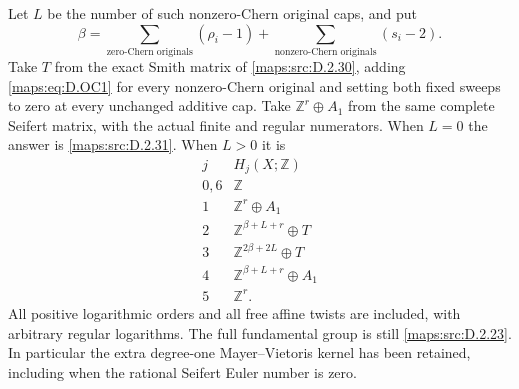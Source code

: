 \begin{theorem}
Let $L$ be the number of such nonzero-Chern original caps,
and put
\[
 \beta=
 \sum_{\text{zero-Chern originals}}(\rho_i-1)
 +\sum_{\text{nonzero-Chern originals}}(s_i-2).
                                                               \tag{D.OC2}\label{maps:eq:D.OC2}
\]
Take $T$ from the exact Smith matrix of \ref{maps:src:D.2.30}, adding
\eqref{maps:eq:D.OC1} for every nonzero-Chern original and setting both
fixed sweeps to zero at every unchanged additive cap.
Take $\mathbb Z^r\oplus A_1$ from the same complete Seifert
matrix, with the actual finite and regular numerators.
When $L=0$ the answer is \ref{maps:src:D.2.31}. When $L>0$ it is
\[
\begin{array}{c|c}
j&H_j(X;\mathbb Z)\\\hline
0,6&\mathbb Z\\
1&\mathbb Z^r\oplus A_1\\
2&\mathbb Z^{\beta+L+r}\oplus T\\
3&\mathbb Z^{2\beta+2L}\oplus T\\
4&\mathbb Z^{\beta+L+r}\oplus A_1\\
5&\mathbb Z^r.
\end{array}                                                   \tag{D.OC3}\label{maps:eq:D.OC3}
\]
All positive logarithmic orders and all free affine twists
are included, with arbitrary regular logarithms. The full
fundamental group is still \ref{maps:src:D.2.23}. In particular the extra
degree-one Mayer--Vietoris kernel has been retained, including
when the rational Seifert Euler number is zero.

\end{theorem}


